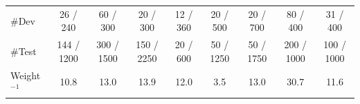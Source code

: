 \begin{table}[t]
{\begin{tabular}{@{}lcccccccc@{}}
\#Dev    & 26 / 240                                                   & 60 / 300    & 20 / 300                                                  & 12 / 360                                                    & 20 / 500                                                            & 20 / 700                                               & 80 / 400                                               & 31 / 400                                               \\
\#Test   & 144 / 1200                                                 & 300 / 1500  & 150 / 2250                                                & 20 / 600                                                    & 50 / 1250                                                           & 50 / 1750                                                & 200 / 1000                                             & 100 / 1000                                             \\ \midrule
Weight$^{-1}$ & 10.8 & 13.0	& 13.9 & 12.0 & 3.5 & 13.0 & 30.7 & 11.6

\\ \bottomrule
\end{tabular}
}
\vspace{-7mm}
\end{table}